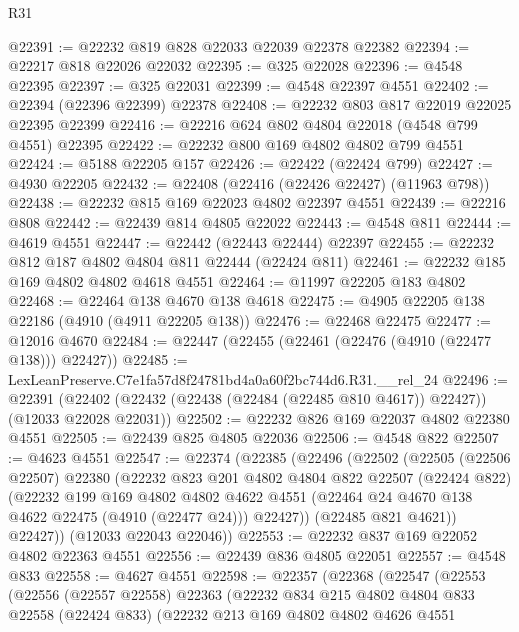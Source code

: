 \begin{lexlean}{R31}
\begin{coremodule}
@22391 := @22232 @819 @828 @22033 @22039 @22378 @22382
@22394 := @22217 @818 @22026 @22032
@22395 := @325 @22028
@22396 := @4548 @22395
@22397 := @325 @22031
@22399 := @4548 @22397 @4551
@22402 := @22394 (@22396 @22399) @22378
@22408 := @22232 @803 @817 @22019 @22025 @22395 @22399
@22416 := @22216 @624 @802 @4804 @22018 (@4548 @799 @4551) @22395
@22422 := @22232 @800 @169 @4802 @4802 @799 @4551
@22424 := @5188 @22205 @157
@22426 := @22422 (@22424 @799)
@22427 := @4930 @22205
@22432 := @22408 (@22416 (@22426 @22427) (@11963 @798))
@22438 := @22232 @815 @169 @22023 @4802 @22397 @4551
@22439 := @22216 @808
@22442 := @22439 @814 @4805 @22022
@22443 := @4548 @811
@22444 := @4619 @4551
@22447 := @22442 (@22443 @22444) @22397
@22455 := @22232 @812 @187 @4802 @4804 @811 @22444 (@22424 @811)
@22461 := @22232 @185 @169 @4802 @4802 @4618 @4551
@22464 := @11997 @22205 @183 @4802
@22468 := @22464 @138 @4670 @138 @4618
@22475 := @4905 @22205 @138 @22186 (@4910 (@4911 @22205 @138))
@22476 := @22468 @22475
@22477 := @12016 @4670
@22484 := @22447 (@22455 (@22461 (@22476 (@4910 (@22477 @138))) @22427))
@22485 := LexLeanPreserve.C7e1fa57d8f24781bd4a0a60f2bc744d6.R31.__rel_24
@22496 := @22391
    (@22402 (@22432 (@22438 (@22484 (@22485 @810 @4617)) @22427)) (@12033 @22028 @22031))
@22502 := @22232 @826 @169 @22037 @4802 @22380 @4551
@22505 := @22439 @825 @4805 @22036
@22506 := @4548 @822
@22507 := @4623 @4551
@22547 := @22374
    (@22385
      (@22496
        (@22502
          (@22505
            (@22506 @22507)
            @22380
            (@22232
              @823
              @201
              @4802
              @4804
              @822
              @22507
              (@22424 @822)
              (@22232
                @199
                @169
                @4802
                @4802
                @4622
                @4551
                (@22464 @24 @4670 @138 @4622 @22475 (@4910 (@22477 @24)))
                @22427))
            (@22485 @821 @4621))
          @22427))
      (@12033 @22043 @22046))
@22553 := @22232 @837 @169 @22052 @4802 @22363 @4551
@22556 := @22439 @836 @4805 @22051
@22557 := @4548 @833
@22558 := @4627 @4551
@22598 := @22357
    (@22368
      (@22547
        (@22553
          (@22556
            (@22557 @22558)
            @22363
            (@22232
              @834
              @215
              @4802
              @4804
              @833
              @22558
              (@22424 @833)
              (@22232
                @213
                @169
                @4802
                @4802
                @4626
                @4551

\end{coremodule}
\end{lexlean}
